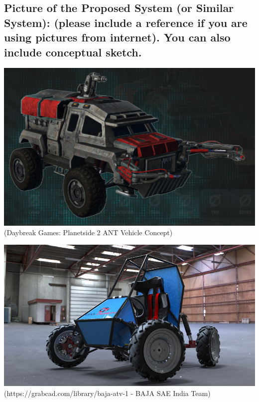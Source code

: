 \subsection{Picture of  the Proposed System (or Similar System): (please include a reference if you are using pictures from internet). You can also include conceptual sketch.}
\includegraphics{c-1-Images/Planetside.png}
(Daybreak Games: Planetside 2 ANT Vehicle Concept)

\includegraphics{c-1-Images/BAJA.jpeg}
(https://grabcad.com/library/baja-atv-1 - BAJA SAE India Team)
